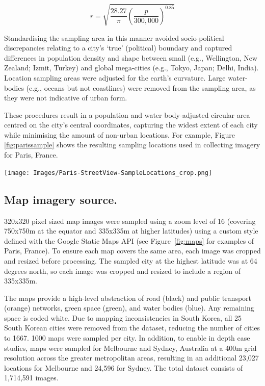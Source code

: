 \documentclass{nature}
\makeatletter
\renewenvironment*{figure}{\@float{figure}}{\end@float}
\makeatother
\begin{document}
\begin{methods}
\begin{equation}
r = \sqrt{ \frac{28.27}{\pi} \left( \frac{p}{300,000}  \right) ^{0.85} }
\end{equation}


Standardising the sampling area in this manner avoided socio-political discrepancies relating to a city's `true' (political) boundary and captured differences in population density and shape between small (e.g., Wellington, New Zealand; Izmit, Turkey) and global mega-cities (e.g., Tokyo, Japan;  Delhi, India). Location sampling areas were adjusted for the earth's curvature\cite{Sinnott1984}. Large water-bodies (e.g., oceans but not coastlines) were removed from the sampling area, as they were not indicative of urban form. 

These procedures result in a population and water body-adjusted circular area centred on the city's central coordinates, capturing the widest extent of each city while minimising the amount of non-urban locations. For example, Figure \ref{fig:parissample} shows the resulting sampling locations used in collecting imagery for Paris, France. 

\begin{figure}
    \centering    
\texttt{[image: Images/Paris-StreetView-SampleLocations\_crop.png]}  
\caption{\bf Sampling locations for map imagery (from Paris, France)\cite{GoogleStatic2017}.}    
 \label{fig:parissample}  
\end{figure} 



\subsection{Map imagery source.}\label{methodsimagery}

320x320 pixel sized map images were sampled using a zoom level of 16 (covering 750x750m at the equator and 335x335m at higher latitudes) using a custom style defined with the Google Static Maps API\cite{GoogleStatic2017} (see Figure~\ref{fig:maps} for examples of Paris, France). To ensure each map covers the same area, each image was cropped and resized before processing. The sampled city at the highest latitude was at 64 degrees north, so each image was cropped and resized to include a region of 335x335m. 

The maps provide a high-level abstraction of road (black) and public transport (orange) networks, green space (green), and water bodies (blue). Any remaining space is coded white. Due to mapping inconsistencies in South Korea, all 25 South Korean cities were removed from the dataset, reducing the number of cities to 1667. 1000 maps were sampled per city. In addition, to enable in depth case studies, maps were sampled for Melbourne and Sydney, Australia at a 400m grid resolution across the greater metropolitan areas, resulting in an additional 23,027 locations for Melbourne and 24,596 for Sydney. The total dataset consists of 1,714,591 images.




\end{methods}
\end{document}

